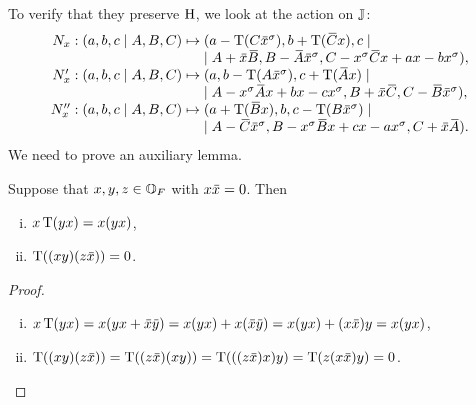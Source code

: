 To verify that they preserve $\mathrm{H}$, we look at the action on $\mathbb{J}$:
\begin{equation}
	\label{eq:3_nx_image}
	\begin{array}{r@{\;}c@{\;}l}
		N_x: (a,b,c\mid A,B,C) & \mapsto &
		(a-\Tr(C\ovx ^{\s}), b+\Tr(\ovC x), c \mid \\
		& & \mid	A+\ovx \ovB , B-\ovA \ovx ^{\s},C-x^{\s}\ovC x+ax-bx^{\s}), \\
		
		N_x': (a,b,c\mid A,B,C) & \mapsto & 
		(a, b-\Tr(A \ovx^{\s}), c+\Tr(\ovA x) \mid \\
		& & \mid	A - x^{\s} \ovA x + bx-cx^{\s}, B + \ovx \ovC, C - \ovB \ovx^{\s}), \\
		
		N_x'': (a,b,c\mid A,B,C) & \mapsto &
		(a+\Tr(\ovB x), b, c-\Tr(B\ovx^{\s}) \mid \\
		& & \mid 	A-\ovC\ovx^{\s}, B-x^{\s}\ovB x + cx - ax^{\s}, C+\ovx\ovA).
	\end{array}
\end{equation}
We need to prove an auxiliary lemma.

\begin{lemma}
	\label{lemma:3_oct_aux}
	Suppose that $x,y,z \in \mathbb{O}_F$ with $x \mathord{\mbox{\hspace*{0pt}}\,\overline{\!x\!\!\;}\!\:}\mbox{\hspace*{0pt}}  = 0$. Then
		\begin{enumerate}[(i)]
			\item $x\operatorname{T}(yx) = x(yx)$,
			\item $\operatorname{T}( (xy)(z\mathord{\mbox{\hspace*{0pt}}\,\overline{\!x\!\!\;}\!\:}\mbox{\hspace*{0pt}} ) ) = 0$.		
		\end{enumerate}
\end{lemma}

\begin{proof}
	\leavevmode
	\begin{enumerate}[(i)]
	
	\item $x\Tr(yx) = x (yx + \ovx \ovy ) = x(yx) + x(\ovx \ovy )
		 = x(yx) + (x\ovx )y = x(yx)$,
		 
	\item $\Tr( (xy)(z\ovx ) ) = \Tr( (z\ovx ) (xy) ) = \Tr( ((z\ovx )x) y ) = 
		\Tr(z(x\ovx )y) = 0$. \qedhere
	\end{enumerate}
\end{proof}

